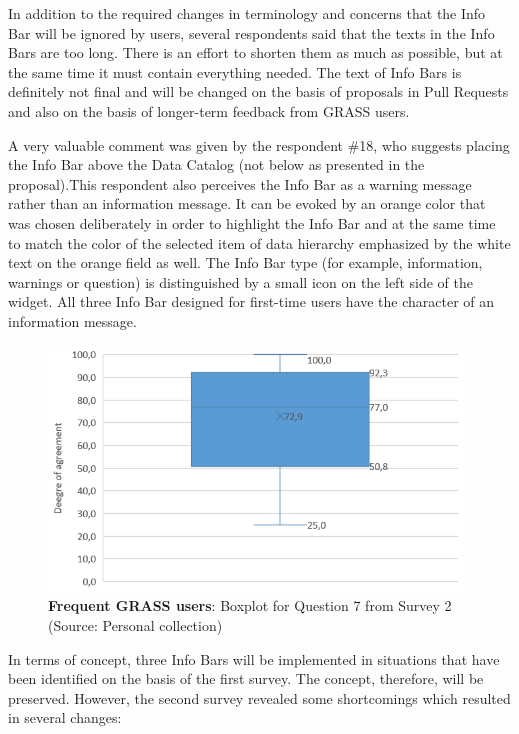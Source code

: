 \documentclass[a4paper,10pt,twoside]{article}
\begin{document}
\noindent In addition to the required changes in terminology and concerns that the Info Bar will be ignored by users, several respondents said that the texts in the Info Bars are too long. There is an effort to shorten them as much as possible, but at the same time it must contain everything needed. The text of Info Bars is definitely not final and will be changed on the basis of proposals in Pull Requests and also on the basis of longer-term feedback from GRASS users.

A very valuable comment was given by the respondent \#18, who suggests placing the Info Bar above the Data Catalog (not below as presented in the proposal).This respondent also perceives the Info Bar as a warning message rather than an information message. It can be evoked by an orange color that was chosen deliberately in order to highlight the Info Bar and at the same time to match the color of the selected item of data hierarchy emphasized by the white text on the orange field as well. The Info Bar type (for example, information, warnings or question) is distinguished by a small icon on the left side of the widget. All three Info Bar designed for first-time users have the character of an information message.

\vspace{0.3cm}
\begin{figure}[hbt!] 
\begin{center}
\includegraphics[width=11cm]{../surveys/analyzed_data/survey2_question7_boxplot_group2.png} 
\caption[\textbf{Frequent GRASS users}: Boxplot for Question 7 from Survey 2]{\textbf{Frequent GRASS users}: Boxplot for Question 7 from Survey 2 (Source: Personal collection)}
\label{fig:survey2_question7_boxplot_group2}
\end{center}
\end{figure}

\noindent In terms of concept, three Info Bars will be implemented in situations that have been identified on the basis of the first survey. The concept, therefore, will be preserved. However, the second survey revealed some shortcomings which resulted in several changes:
\end{document}
